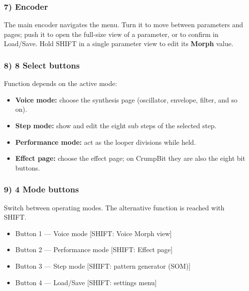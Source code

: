 \subsubsection{7) Encoder}\label{encoder}

The main encoder navigates the menu. Turn it to move between parameters
and pages; push it to open the full-size view of a parameter, or to
confirm in Load/Save. Hold SHIFT in a single parameter view to edit its
\textbf{Morph} value.

\subsubsection{8) 8 Select buttons}\label{select-buttons}

Function depends on the active mode:

\begin{itemize}
\tightlist
\item
  \textbf{Voice mode:} choose the synthesis page (oscillator, envelope,
  filter, and so on).
\item
  \textbf{Step mode:} show and edit the eight sub steps of the selected
  step.
\item
  \textbf{Performance mode:} act as the looper divisions while held.
\item
  \textbf{Effect page:} choose the effect page; on CrumpBit they are
  also the eight bit buttons.
\end{itemize}

\subsubsection{9) 4 Mode buttons}\label{mode-buttons}

Switch between operating modes. The alternative function is reached with
SHIFT.

\begin{itemize}
\tightlist
\item
  Button 1 --- Voice mode {[}SHIFT: Voice Morph view{]}
\item
  Button 2 --- Performance mode {[}SHIFT: Effect page{]}
\item
  Button 3 --- Step mode {[}SHIFT: pattern generator (SOM){]}
\item
  Button 4 --- Load/Save {[}SHIFT: settings menu{]}
\end{itemize}


